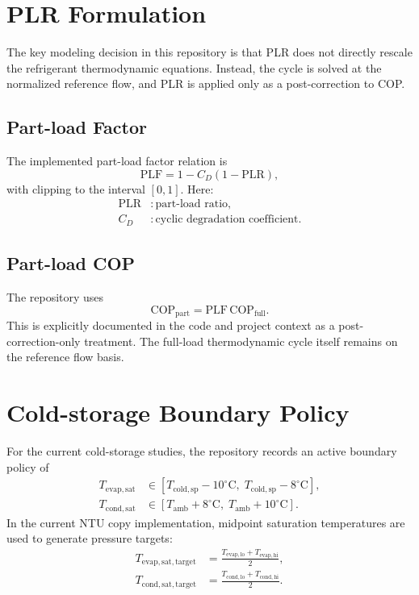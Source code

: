 \documentclass[11pt]{article}
\begin{document}
\section{PLR Formulation}
The key modeling decision in this repository is that PLR does not directly rescale the refrigerant thermodynamic equations. Instead, the cycle is solved at the normalized reference flow, and PLR is applied only as a post-correction to COP.

\subsection{Part-load Factor}
The implemented part-load factor relation is
\begin{equation}
\mathrm{PLF} = 1 - C_D(1-\mathrm{PLR}),
\end{equation}
with clipping to the interval $[0,1]$. Here:
\begin{align}
\mathrm{PLR} &: \text{part-load ratio}, \\
C_D &: \text{cyclic degradation coefficient}.
\end{align}

\subsection{Part-load COP}
The repository uses
\begin{equation}
\mathrm{COP}_{\mathrm{part}} = \mathrm{PLF}\,\mathrm{COP}_{\mathrm{full}}.
\end{equation}
This is explicitly documented in the code and project context as a post-correction-only treatment. The full-load thermodynamic cycle itself remains on the reference flow basis.

\section{Cold-storage Boundary Policy}
For the current cold-storage studies, the repository records an active boundary policy of
\begin{align}
T_{\mathrm{evap,sat}} &\in [T_{\mathrm{cold,sp}} - 10^\circ\mathrm{C},\; T_{\mathrm{cold,sp}} - 8^\circ\mathrm{C}], \\
T_{\mathrm{cond,sat}} &\in [T_{\mathrm{amb}} + 8^\circ\mathrm{C},\; T_{\mathrm{amb}} + 10^\circ\mathrm{C}].
\end{align}
In the current NTU copy implementation, midpoint saturation temperatures are used to generate pressure targets:
\begin{align}
T_{\mathrm{evap,sat,target}} &= \frac{T_{\mathrm{evap,lo}} + T_{\mathrm{evap,hi}}}{2}, \\
T_{\mathrm{cond,sat,target}} &= \frac{T_{\mathrm{cond,lo}} + T_{\mathrm{cond,hi}}}{2}.
\end{align}
\end{document}

